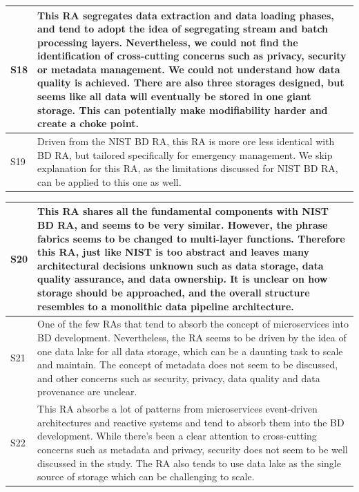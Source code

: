\documentclass{ieeeaccess}
\begin{document}
\begin{table}
\begin{tabular}{|p{0.3cm}|p{16.8cm}|}
        \hline
        S18 & This RA segregates data extraction and data loading phases, and tend to adopt the idea of segregating stream and batch processing layers. Nevertheless, we could not find the identification of cross-cutting concerns such as privacy, security or metadata management. We could not understand how data quality is achieved. There are also three storages designed, but seems like all data will eventually be stored in one giant storage. This can potentially make modifiability harder and create a choke point. \\
        \hline
        S19 & Driven from the NIST BD RA, this RA is more ore less identical with BD RA, but tailored specifically for emergency management. We skip explanation for this RA, as the limitations discussed for NIST BD RA, can be applied to this one as well. \\
        \hline
    \end{tabular}
\end{table}

\begin{table}
    \renewcommand*{\arraystretch}{1.4}
    \begin{tabular}{|p{0.3cm}|p{16.8cm}|}
        \hline
        S20 & This RA shares all the fundamental components with NIST BD RA, and seems to be very similar. However, the phrase fabrics seems to be changed to multi-layer functions. Therefore this RA, just like NIST is too abstract and leaves many architectural decisions unknown such as data storage, data quality assurance, and data ownership. It is unclear on how storage should be approached, and the overall structure resembles to a monolithic data pipeline architecture. \\
        \hline
        S21 & One of the few RAs that tend to absorb the concept of microservices into BD development. Nevertheless, the RA seems to be driven by the idea of one data lake for all data storage, which can be a daunting task to scale and maintain. The concept of metadata does not seem to be discussed, and other concerns such as security, privacy, data quality and data provenance are unclear.  \\
        \hline
        S22 & This RA absorbs a lot of patterns from microservices event-driven architectures and reactive systems and tend to absorb them into the BD development. While there's been a clear attention to cross-cutting concerns such as metadata and privacy, security does not seem to be well discussed in the study. The RA also tends to use data lake as the single source of storage which can be challenging to scale.  \\
        \hline
    \end{tabular}
\end{table}
\end{document}
